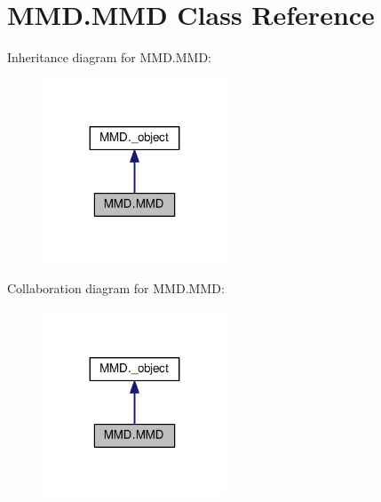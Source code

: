 \hypertarget{classMMD_1_1MMD}{}\section{M\+M\+D.\+M\+MD Class Reference}
\label{classMMD_1_1MMD}


Inheritance diagram for M\+M\+D.\+M\+MD\+:\nopagebreak
\begin{figure}[H]
\begin{center}
\leavevmode
\includegraphics[width=155pt]{classMMD_1_1MMD__inherit__graph}
\end{center}
\end{figure}


Collaboration diagram for M\+M\+D.\+M\+MD\+:\nopagebreak
\begin{figure}[H]
\begin{center}
\leavevmode
\includegraphics[width=155pt]{classMMD_1_1MMD__coll__graph}
\end{center}
\end{figure}

